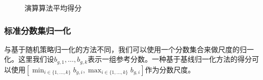 \begin{figure}[!t]
	\centering
	
	\caption{演算算法平均得分}
	\label{Fig: Aggregate normalized scores for the five reinforcement learning agents.}
\end{figure}



\subsubsection{标准分数集归一化}
与基于随机策略归一化的方法不同，我们可以使用一个分数集合来做尺度的归一化。这里我们设$b_{g,1},\dots,b_{g,k}$表示一组参考分数。一种基于基线归一化方法的得分可以使用$\left[\min _{i \in\{1, \ldots, k\}} b_{g, i}, \max _{i \in\{1, \ldots, k\}} b_{g, i}\right]$作为分数尺度。

